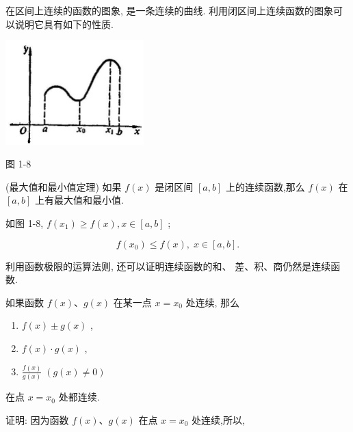 \documentclass[lang=cn,newtx,10pt,scheme=chinese]{elegantbook}
\begin{document}
在区间上连续的函数的图象, 是一条连续的曲线. 利用闭区间上连续函数的图象可以说明它具有如下的性质.

\begin{center}
	\includegraphics[max width=0.4\textwidth]{images/01912c18-5c3f-733d-b775-749ba9897a9d_34_898703.jpg}
\end{center}

图 1-8

\begin{property}

(最大值和最小值定理) 如果 \(f\left( x\right)\) 是闭区间 \(\left\lbrack {a,b}\right\rbrack\) 上的连续函数,那么 \(f\left( x\right)\) 在 \(\left\lbrack {a,b}\right\rbrack\) 上有最大值和最小值.

\end{property}

如图 1-8, \(f\left( {x}_{1}\right) \geq f\left( x\right) ,x \in \left\lbrack {a,b}\right\rbrack\) ;

\[
f\left( {x}_{0}\right) \leq f\left( x\right) ,\;x \in \left\lbrack {a,b}\right\rbrack .
\]

利用函数极限的运算法则, 还可以证明连续函数的和、 差、积、商仍然是连续函数.

\begin{property}

如果函数 \(f\left( x\right) \text{、}g\left( x\right)\) 在某一点 \(x = {x}_{0}\) 处连续, 那么

\begin{enumerate}
\item \(f\left( x\right) \pm g\left( x\right)\) ,
\item \(f\left( x\right) \cdot g\left( x\right)\) ,
\item \(\frac{f\left( x\right) }{g\left( x\right) }\;\left( {g\left( x\right) \neq 0}\right)\)
\end{enumerate}

在点 \(x = {x}_{0}\) 处都连续.

\end{property}

证明: 因为函数 \(f\left( x\right) \text{、}g\left( x\right)\) 在点 \(x = {x}_{0}\) 处连续,所以,
\end{document}
